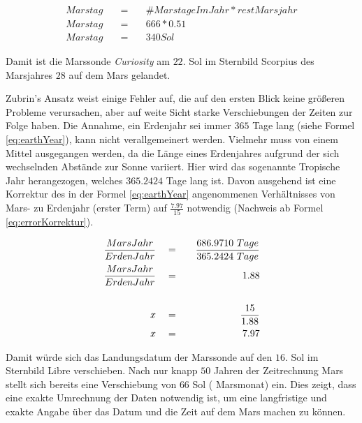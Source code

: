 \begin{eqnarray}
	Marstag \quad & = & \quad \#MarstageImJahr * restMarsjahr \\
	Marstag \quad & = & \quad 666 * 0.51 \\
	Marstag \quad & = & \quad 340 Sol 
	\label{eq:MarsMonthSol}
\end{eqnarray}

Damit ist die Marssonde \textit{Curiosity} am $22.$ Sol im Sternbild Scorpius
des Marsjahres $28$ auf dem Mars gelandet.

Zubrin's Ansatz weist einige Fehler auf, die auf den ersten Blick keine
gr{\"o}{\ss}eren Probleme verursachen, aber auf weite Sicht starke
Verschiebungen der Zeiten zur Folge haben. Die Annahme, ein Erdenjahr sei immer $365$ Tage lang (siehe Formel
\ref{eq:earthYear}), kann nicht verallgemeinert werden. Vielmehr muss von einem
Mittel ausgegangen werden, da die L{\"a}nge eines Erdenjahres aufgrund der sich
wechselnden Abst{\"a}nde zur Sonne variiert. Hier wird das sogenannte Tropische Jahr
herangezogen, welches $365.2424$ Tage lang ist. Davon ausgehend ist eine
Korrektur des in der Formel \ref{eq:earthYear} angenommenen Verh{\"a}ltnisses von
Mars- zu Erdenjahr (erster Term) auf $\frac{7.97}{15}$ notwendig (Nachweis ab
Formel \ref{eq:errorKorrektur}).

\begin{eqnarray}
	\frac{MarsJahr}{ErdenJahr} \quad & = & \quad \frac{686.9710 \ Tage}{365.2424 \
	Tage}
	\\
	\label{eq:errorKorrektur}  
	\frac{MarsJahr}{ErdenJahr} \quad & = & \quad 1.88 \\
	\notag\\
	x \quad & = & \quad \frac{15}{1.88} \\
	x \quad & = & \quad 7.97 
\end{eqnarray}

Damit w{\"u}rde sich das Landungsdatum der Marssonde auf den $16.$ Sol im Sternbild
Libre verschieben. Nach nur knapp $50$ Jahren der Zeitrechnung Mars stellt sich
bereits eine Verschiebung von $66$ Sol (\ca 1 Marsmonat) ein. Dies zeigt, dass
eine exakte Umrechnung der Daten notwendig ist, um eine langfristige und exakte
Angabe {\"u}ber das Datum und die Zeit auf dem Mars machen zu k{\"o}nnen.
